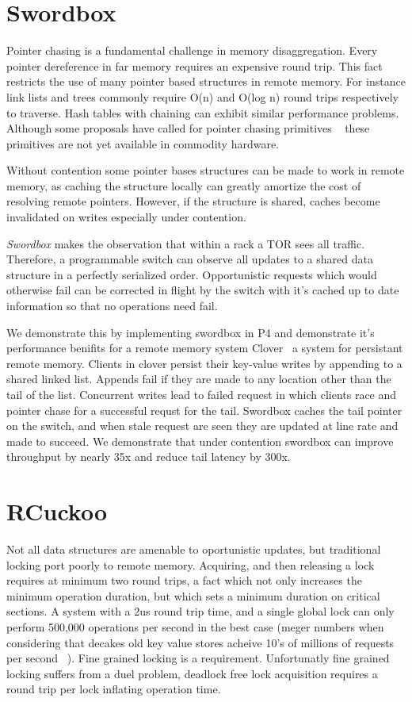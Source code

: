 \section{Swordbox}

Pointer chasing is a fundamental challenge in memory
disaggregation. Every pointer dereference in far memory
requires an expensive round trip. This fact restricts the
use of many pointer based structures in remote memory. For
instance link lists and trees commonly require O(n) and
O(log n) round trips respectively to traverse. Hash tables
with chaining can exhibit similar performance problems.
Although some proposals have called for pointer chasing
primitives ~\cite{supernic, prism} these primitives are not
yet available in commodity hardware.

Without contention some pointer bases structures can be made
to work in remote memory, as caching the structure locally
can greatly amortize the cost of resolving remote pointers.
However, if the structure is shared, caches become
invalidated on writes especially under contention.

\textit{Swordbox} makes the observation that within a rack a
TOR sees all traffic. Therefore, a programmable switch can
observe all updates to a shared data structure in a
perfectly serialized order. Opportunistic requests which
would otherwise fail can be corrected in flight by the
switch with it's cached up to date information so that no
operations need fail.

We demonstrate this by implementing swordbox in P4 and
demonstrate it's performance benifits for a remote memory
system Clover~\cite{clover} a system for persistant remote
memory. Clients in clover persist their key-value writes by
appending to a shared linked list. Appends fail if they are
made to any location other than the tail of the list.
Concurrent writes lead to failed request in which clients
race and pointer chase for a successful requst for the tail.
Swordbox caches the tail pointer on the switch, and when
stale request are seen they are updated at line rate and
made to succeed.  We demonstrate that under contention
swordbox can improve throughput by nearly 35x and reduce
tail latency by 300x. 

\section{RCuckoo}

Not all data structures are amenable to oportunistic
updates, but traditional locking port poorly to remote
memory. Acquiring, and then releasing a lock requires at
minimum two round trips, a fact which not only increases the
minimum operation duration, but which sets a minimum
duration on critical sections. A system with a 2us round
trip time, and a single global lock can only perform 500,000
operations per second in the best case (meger numbers when
considering that decakes old key value stores acheive 10's
of millions of requests per second ~\cite{herd}). Fine
grained locking is a requirement. Unfortunatly fine grained
locking suffers from a duel problem, deadlock free lock
acquisition requires a round trip per lock inflating
operation time. 

